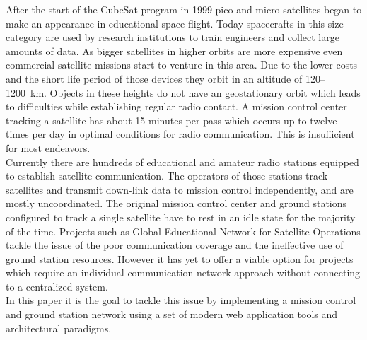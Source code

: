 After the start of the CubeSat program in 1999 pico and micro satellites began to make an appearance in educational space flight. Today spacecrafts in this size category are used by research institutions to train engineers and collect large amounts of data. As bigger satellites in higher orbits are more expensive even commercial satellite missions start to venture in this area. Due to the lower costs and the short life period of those devices they orbit in an altitude of 120--1200~km. Objects in these  heights do not have an geostationary orbit which leads to difficulties while establishing regular radio contact. A mission control center tracking a satellite has about 15 minutes per pass which occurs up to twelve times per day in optimal conditions for radio communication. This is insufficient for most endeavors. \\

Currently there are hundreds of educational and amateur radio stations equipped to establish satellite communication. The operators of those stations track satellites and transmit down-link data to mission control independently, and are mostly uncoordinated. The original mission control center and ground stations configured to track a single satellite have to rest in an idle state for the majority of the time. Projects such as Global Educational Network for Satellite Operations tackle the issue of the poor communication coverage and the ineffective use of ground station resources. However it has yet to offer a viable option for projects which require an individual communication network approach without connecting to a centralized system. \\

In this paper it is the goal to tackle this issue by implementing a mission control and ground station network using a set of modern web application tools and architectural paradigms. \\